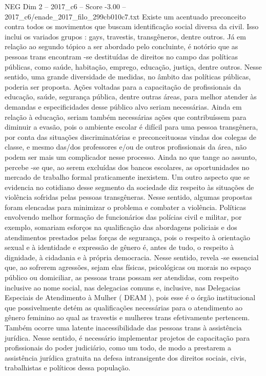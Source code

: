 \begin{textsample}{NEG Dim 2 – 2017\_c6 – Score -3.00 – 2017\_c6/enade\_2017\_filo\_299cb010c7.txt}
Existe um acentuado preconceito contra todos os movimentos que buscam identificação social diversa da civil.
Isso inclui os variados grupos : gays, travestis, transgêneros, dentre outros.
Já em relação ao segundo tópico a ser abordado pelo concluinte, é notório que as pessoas trans encontram -se destituídas de direitos no campo das políticas públicas, como saúde, habitação, emprego, educação, justiça, dentre outros.
Nesse sentido, uma grande diversidade de medidas, no âmbito das políticas públicas, poderia ser proposta.
Ações voltadas para a capacitação de profissionais da educação, saúde, segurança pública, dentre outras áreas, para melhor atender às demandas e especificidades desse público alvo seriam necessárias.
Ainda em relação à educação, seriam também necessárias ações que contribuíssem para diminuir a evasão, pois o ambiente escolar é difícil para uma pessoa transgênera, por conta das situações discriminatórias e preconceituosas vindas dos colegas de classe, e mesmo das/dos professores e/ou de outros profissionais da área, não podem ser mais um complicador nesse processo.
Ainda no que tange ao assunto, percebe -se que, ao serem excluídas dos bancos escolares, as oportunidades no mercado de trabalho formal praticamente inexistem.
Um outro aspecto que se evidencia no cotidiano desse segmento da sociedade diz respeito às situações de violência sofridas pelas pessoas transgêneras.
Nesse sentido, algumas propostas foram elencadas para minimizar o problema e combater a violência.
Políticas envolvendo melhor formação de funcionários das polícias civil e militar, por exemplo, somariam esforços na qualificação das abordagens policiais e dos atendimentos prestados pelas forças de segurança, pois o respeito à orientação sexual e à identidade e expressão de gênero é, antes de tudo, o respeito à dignidade, à cidadania e à própria democracia.
Nesse sentido, revela -se essencial que, ao sofrerem agressões, sejam elas físicas, psicológicas ou morais no espaço público ou domiciliar, as pessoas trans possam ser atendidas, com respeito inclusive ao nome social, nas delegacias comuns e, inclusive, nas Delegacias Especiais de Atendimento à Mulher ( DEAM ), pois esse é o órgão institucional que possivelmente detém as qualificações necessárias para o atendimento ao gênero feminino ao qual as travestis e mulheres trans efetivamente pertencem.
Também ocorre uma latente inacessibilidade das pessoas trans à assistência jurídica.
Nesse sentido, é necessário implementar projetos de capacitação para profissionais do poder judiciário, como um todo, de modo a prestarem a assistência jurídica gratuita na defesa intransigente dos direitos sociais, civis, trabalhistas e políticos dessa população.

\end{textsample}
